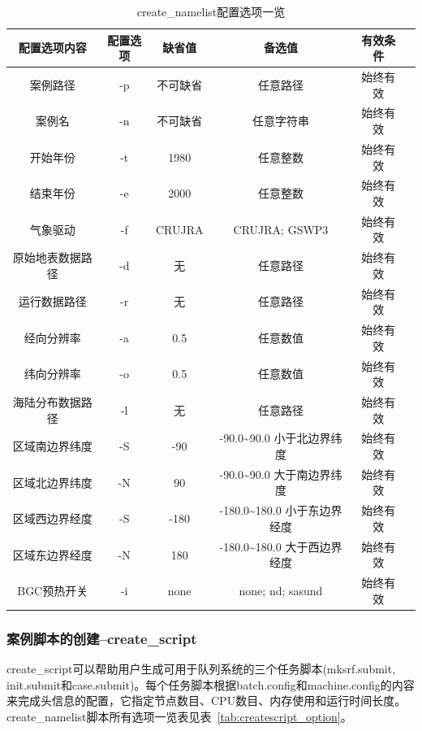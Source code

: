 \documentclass[a4paper,12pt,twoside]{article}
\begin{document}
\begin{table}[!htbp]
\renewcommand{\arraystretch}{1.5}
\centering 
\caption{create\_namelist配置选项一览}\label{tab:createnml_option}
\begin{tabular}{
cccccc} \toprule
\textbf{配置选项内容} & \textbf{配置选项} & \textbf{缺省值} & \textbf{备选值} & \textbf{有效条件}\\ \midrule
案例路径 & -p & 不可缺省 & 任意路径 & 始终有效 \\
案例名  & -n & 不可缺省 & 任意字符串 & 始终有效 \\
开始年份 & -t & 1980 & 任意整数 & 始终有效\\
结束年份 & -e & 2000 & 任意整数 & 始终有效\\
气象驱动 & -f & CRUJRA & CRUJRA; GSWP3  & 始终有效\\
原始地表数据路径 & -d & 无 & 任意路径 & 始终有效\\
运行数据路径 & -r & 无 & 任意路径 & 始终有效\\
经向分辨率 & -a & 0.5 & 任意数值 & 始终有效\\
纬向分辨率 & -o & 0.5 & 任意数值 & 始终有效\\
海陆分布数据路径 & -l & 无 & 任意路径 & 始终有效\\
区域南边界纬度 & -S & -90 & -90.0\textasciitilde90.0 小于北边界纬度 & 始终有效\\
区域北边界纬度 & -N & 90 & -90.0\textasciitilde90.0 大于南边界纬度 & 始终有效\\
区域西边界经度 & -S & -180 & -180.0\textasciitilde180.0 小于东边界经度 & 始终有效\\
区域东边界经度 & -N & 180 & -180.0\textasciitilde180.0 大于西边界经度 & 始终有效\\
BGC预热开关 & -i &none & none; nd; sasund& 始终有效 \\
\bottomrule
\end{tabular}
\end{table}

\subsubsection{案例脚本的创建--create\_script}

create\_script可以帮助用户生成可用于队列系统的三个任务脚本(mksrf.submit, init.submit和case.submit)。每个任务脚本根据batch.config和machine.config的内容来完成头信息的配置，它指定节点数目、CPU数目、内存使用和运行时间长度。create\_namelist脚本所有选项一览表见表~\ref{tab:createscript_option}。
\end{document}
